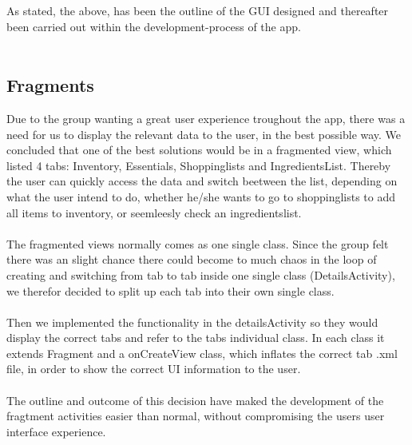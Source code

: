 \documentclass[12pt]{article}
\begin{document}
As stated, the above, has been the outline of the GUI designed and thereafter been carried out within the development-process of the app.
\\
\\
\subsection{Fragments}
Due to the group wanting a great user experience troughout the app, there was a need for us to display the relevant data to the user, in the best possible way.
We concluded that one of the best solutions would be in a fragmented view, which listed 4 tabs: Inventory, Essentials, Shoppinglists and IngredientsList.
Thereby the user can quickly access the data and switch beetween the list, depending on what the user intend to do, whether he/she wants to go to shoppinglists to add all items to inventory, or seemleesly check an ingredientslist.
\\
\\
The fragmented views normally comes as one single class. Since the group felt there was an slight chance there could become to much chaos in the loop of creating and switching from tab to tab inside one single class (DetailsActivity), we therefor decided to split up each tab into their own single class.
\\
\\
Then we implemented the functionality in the detailsActivity so they would display the correct tabs and refer to the tabs individual class.
In each class it extends Fragment and a onCreateView class, which inflates the correct tab .xml file, in order to show the correct UI information to the user.
\\
\\
The outline and outcome of this decision have maked the development of the fragtment activities easier than normal, without compromising the users user interface experience.
\end{document}
